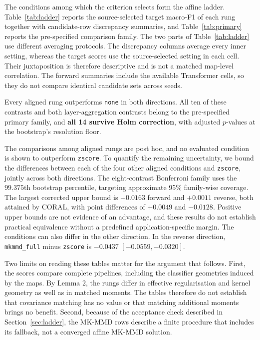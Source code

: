 The conditions among which the criterion selects form the affine ladder.
Table~\ref{tab:ladder} reports the source-selected target macro-F1 of each rung
together with candidate-row discrepancy summaries, and Table~\ref{tab:primary}
reports the pre-specified comparison family. The two parts of
Table~\ref{tab:ladder} use different averaging protocols. The discrepancy
columns average every inner setting, whereas the target scores use the
source-selected setting in each cell. Their juxtaposition is therefore
descriptive and is not a matched map-level correlation. The forward summaries
include the available Transformer cells, so they do not compare identical
candidate sets across seeds.



Every aligned rung outperforms \texttt{none} in both directions. All ten of
these contrasts and both layer-aggregation contrasts belong to the
pre-specified primary family, and \textbf{all 14 survive Holm correction}, with
adjusted $p$-values at the bootstrap's resolution floor.



The comparisons among aligned rungs are post hoc, and no evaluated condition is
shown to outperform \texttt{zscore}. To quantify the remaining uncertainty, we
bound the differences between each of the four other aligned conditions and
\texttt{zscore}, jointly across both directions. The eight-contrast Bonferroni
family uses the $99.375$th bootstrap percentile, targeting approximate 95\%
family-wise coverage. The largest corrected upper bound is $+0.0163$ forward
and $+0.0011$ reverse, both attained by CORAL, with point differences of
$+0.0049$ and $-0.0128$. Positive upper bounds are not evidence of an
advantage, and these results do not establish practical equivalence without a
predefined application-specific margin. The conditions can also differ in the
other direction. In the reverse direction, \texttt{mkmmd\_full} minus
\texttt{zscore} is $-0.0437$ $[-0.0559, -0.0320]$.

Two limits on reading these tables matter for the argument that follows.
First, the scores compare complete pipelines, including the classifier
geometries induced by the maps. By Lemma 2, the rungs differ in effective
regularisation and kernel geometry as well as in matched moments. The tables
therefore do not establish that covariance matching has no value or that
matching additional moments brings no benefit. Second, because of the
acceptance check described in Section~\ref{sec:ladder}, the MK-MMD rows
describe a finite procedure that includes its fallback, not a converged affine
MK-MMD solution.

